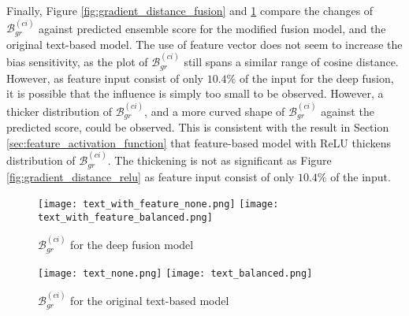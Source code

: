 Finally, Figure \ref{fig:gradient_distance_fusion} and \ref{fig:gradient_distance_no_fusion} compare the changes of $\mathcal{B}^{(ci)}_{gr}$ against predicted ensemble score for the modified fusion model, and the original text-based model. The use of feature vector does not seem to increase the bias sensitivity, as the plot of $\mathcal{B}_{gr}^{(ci)}$ still spans a similar range of cosine distance. However, as feature input consist of only $10.4\%$ of the input for the deep fusion, it is possible that the influence is simply too small to be observed. However, a thicker distribution of $\mathcal{B}_{gr}^{(ci)}$, and a more curved shape of $\mathcal{B}_{gr}^{(ci)}$ against the predicted score, could be observed. This is consistent with the result in Section \ref{sec:feature_activation_function} that feature-based model with ReLU thickens distribution of $\mathcal{B}_{gr}^{(ci)}$. The thickening is not as significant as Figure \ref{fig:gradient_distance_relu} as feature input consist of only $10.4\%$ of the input.

\begin{figure}[H]
    \centering
    \begin{minipage}[t]{0.48\textwidth}
        \centering
        \texttt{[image: text\_with\_feature\_none.png]}
        \hfill
        \texttt{[image: text\_with\_feature\_balanced.png]}
        \caption{$\mathcal{B}^{(ci)}_{gr}$ for the deep fusion model}
        \label{fig:gradient_distance_fusion}
    \end{minipage}
    \hfill
    \begin{minipage}[t]{0.48\textwidth}
        \centering
        \texttt{[image: text\_none.png]}
        \hfill
        \texttt{[image: text\_balanced.png]}
        \caption{$\mathcal{B}^{(ci)}_{gr}$ for the original text-based model}
        \label{fig:gradient_distance_no_fusion}
    \end{minipage}
\end{figure}


